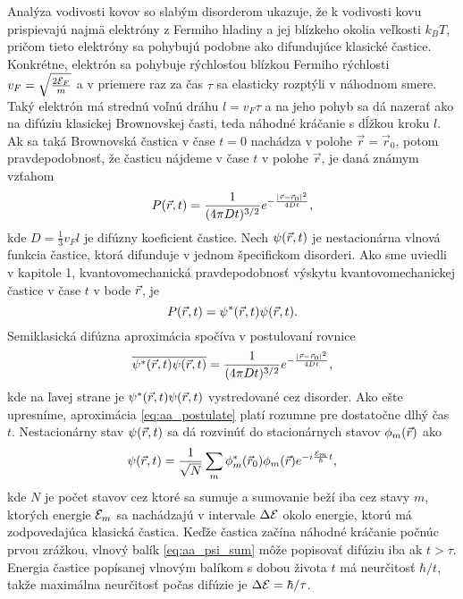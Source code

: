 Analýza vodivosti kovov so slabým disorderom ukazuje, že k vodivosti kovu prispievajú najmä elektróny z Fermiho hladiny a jej blízkeho okolia veľkosti $k_BT$, pričom tieto elektróny sa pohybujú podobne ako difundujúce klasické častice. Konkrétne, elektrón sa pohybuje rýchlosťou blízkou Fermiho rýchlosti $v_F=\sqrt{\frac{2\mathcal{E}_F}{m}}$ a v priemere raz za čas $\tau$ sa elasticky rozptýli v náhodnom smere. Taký elektrón má strednú voľnú dráhu
$l=v_F\tau$ a na jeho pohyb sa dá nazerať ako na difúziu klasickej Brownovskej časti, teda náhodné kráčanie s dĺžkou kroku $l$.
Ak sa taká Brownovská častica v čase $t=0$ nachádza v polohe $\vec r = \vec r_0$, potom pravdepodobnosť, že časticu nájdeme v čase $t$ v polohe $\vec r$, je daná známym vzťahom
\begin{equation}
 \label{eq:diffusion}
 P(\vec{r},t)=\frac{1}{(4\pi Dt)^{3/2}}e^{-\frac{|\vec{r}-\vec{r}_0|^2}{4Dt}} \text{,}
\end{equation}
kde $D =\frac{1}{3}v_Fl $ je difúzny koeficient častice.
Nech $\psi(\vec{r},t)$ je nestacionárna vlnová funkcia častice, ktorá difunduje v jednom špecifickom disorderi. Ako sme uviedli v kapitole 1, kvantovomechanická pravdepodobnosť výskytu kvantovomechanickej častice v čase
$t$ v bode $\vec{r}$, je
\begin{equation}
 \label{eq:aa_pravd}
 P(\vec{r},t)=\psi^*(\vec{r},t)\psi(\vec{r},t) \text{.}
\end{equation}
Semiklasická difúzna aproximácia spočíva v postulovaní rovnice
\begin{equation}
 \label{eq:aa_postulate}
 \overline{\psi^*(\vec{r},t)\psi(\vec{r},t)}=\frac{1}{(4\pi Dt)^{3/2}}e^{-\frac{|\vec{r}-\vec{r}_0|^2}{4Dt}} \text{,}
\end{equation}
kde na ľavej strane je $\psi^*(\vec{r},t)\psi(\vec{r},t)$ vystredované cez disorder. Ako ešte upresníme, aproximácia \eqref{eq:aa_postulate} platí rozumne pre dostatočne dlhý čas $t$.
Nestacionárny stav $\psi(\vec{r},t)$ sa dá rozvinúť do stacionárnych stavov $\phi_m(\vec{r})$ ako
\begin{equation}
 \label{eq:aa_psi_sum}
 \psi(\vec{r},t)=\frac{1}{\sqrt{N}}\sum_m \phi_m^*(\vec{r}_0)\phi_m(\vec{r})e^{-i\frac{\mathcal{E}_m}{\hbar}t} \text{,}
\end{equation}
kde $N$ je počet stavov cez ktoré sa sumuje a sumovanie beží iba cez stavy $m$, ktorých energie $\mathcal{E}_m$ sa nachádzajú v intervale $\Delta \mathcal{E}$ okolo energie, ktorú má zodpovedajúca klasická častica.
Keďže častica začína náhodné kráčanie počnúc prvou zrážkou, vlnový balík \eqref{eq:aa_psi_sum} môže popisovať difúziu iba ak $t > \tau$. Energia častice popísanej
vlnovým balíkom s dobou života $t$ má neurčitosť $\hbar/t$, takže maximálna neurčitosť počas difúzie je $\Delta \mathcal{E}=\hbar/\tau$.


